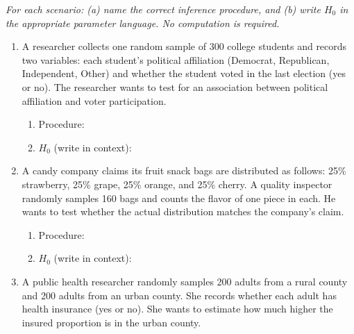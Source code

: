 \documentclass[10pt]{article}
\begin{document}
\namedateperiod

\vspace{0.12in}

\textit{For each scenario: (a) name the correct inference procedure, and (b) write $H_0$ in
the appropriate parameter language. No computation is required.}

\vspace{0.10in}
\begin{enumerate}

\item A researcher collects one random sample of 300 college students and records two
      variables: each student's political affiliation (Democrat, Republican, Independent, Other)
      and whether the student voted in the last election (yes or no). The researcher wants to
      test for an association between political affiliation and voter participation.

      \begin{enumerate}[label=\alph*.]
        \item Procedure: 
        \item $H_0$ (write in context): 
      \end{enumerate}

\vspace{0.14in}

\item A candy company claims its fruit snack bags are distributed as follows: 25\% strawberry,
      25\% grape, 25\% orange, and 25\% cherry. A quality inspector randomly samples 160 bags and
      counts the flavor of one piece in each. He wants to test whether the actual distribution
      matches the company's claim.

      \begin{enumerate}[label=\alph*.]
        \item Procedure: 
        \item $H_0$ (write in context): 
      \end{enumerate}

\vspace{0.14in}

\item A public health researcher randomly samples 200 adults from a rural county and 200 adults
      from an urban county. She records whether each adult has health insurance (yes or no). She
      wants to estimate how much higher the insured proportion is in the urban county.


\end{enumerate}
\end{document}
